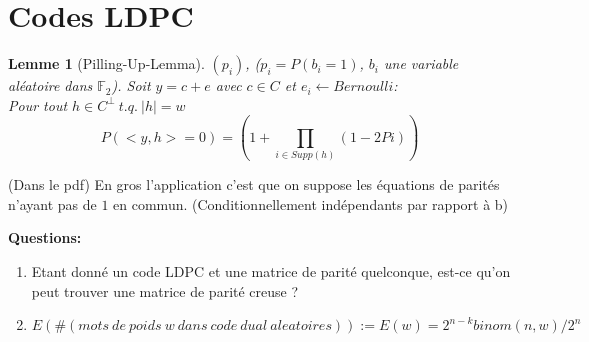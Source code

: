 \documentclass[12pt]{article}
\theoremstyle{plain}
\newtheorem{lem}[subsubsection]{Lemme}
\theoremstyle{definition}
\theoremstyle{remark}
\newcommand{\F}{\mathbb{F}}
\begin{document}
\section{Codes LDPC}

\begin{lem}[Pilling-Up-Lemma]
    $(p_i)$, ($p_i=P(b_i=1)$, $b_i$ 
    une variable aléatoire dans $\F_2$). Soit $y=c+e$ avec $c\in C$ et $e_i\leftarrow Bernoulli$:\\
    \indent Pour tout $h\in C^{\perp}~t.q.~|h|=w$
    \[P(<y,h>=0)=(1+\prod_{i\in Supp(h)}(1-2Pi))\]
\end{lem}
(Dans le pdf)
En gros l'application c'est que on suppose les 
équations de parités n'ayant pas de $1$ en commun. 
(Conditionnellement indépendants par rapport à b)

\textbf{Questions:}
\begin{enumerate}
    \item Etant donné un code LDPC et une matrice de parité 
quelconque, est-ce qu'on peut trouver une matrice de 
parité creuse ?
    \item $E(\#(mots~de~poids~w~dans~code~dual~aleatoires)):=
    E(w)=2^{n-k}binom(n,w)/2^n$
    
\end{enumerate}
\end{document}
